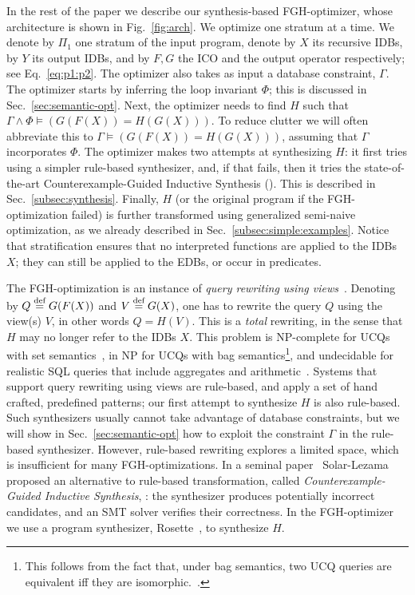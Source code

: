 In the rest of the paper we describe our synthesis-based
FGH-optimizer, whose architecture is shown in Fig.~\ref{fig:arch}.  We
optimize one stratum at a time.  We denote by $\Pi_1$ one stratum of
the input program, denote by $X$ its recursive IDBs, by $Y$ its output
IDBs, and by $F,G$ the ICO and the output operator respectively; see
Eq.~\eqref{eq:p1:p2}.  The optimizer also takes as input a database
constraint, $\Gamma$.  The optimizer starts by inferring the loop
invariant $\Phi$; this is discussed in Sec.~\ref{sec:semantic-opt}.
Next, the optimizer needs to find $H$ such that
$\Gamma \wedge \Phi \models \left(G(F(X)) = H(G(X))\right)$.  To
reduce clutter we will often abbreviate this to
$\Gamma \models \left(G(F(X)) = H(G(X))\right)$, assuming that
$\Gamma$ incorporates $\Phi$.  The optimizer makes two attempts at
synthesizing $H$: it first tries using a simpler rule-based
synthesizer, and, if that fails, then it tries the state-of-the-art
Counterexample-Guided Inductive Synthesis (\cegis).  This is described
in Sec.~\ref{subsec:synthesis}.  Finally, $H$ (or the original program
if the FGH-optimization failed) is further transformed using
generalized semi-naive optimization, as we already described in
Sec.~\ref{subsec:simple:examples}.  Notice that stratification ensures
that no interpreted functions are applied to the IDBs $X$; they can
still be applied to the EDBs, or occur in predicates.

The FGH-optimization is an instance of {\em query rewriting using
  views}~\cite{DBLP:journals/vldb/Halevy01,DBLP:conf/sigmod/GoldsteinL01}.
Denoting by $Q \stackrel{\text{def}}{=} G(F(X))$ and $V \stackrel{\text{def}}{=} G(X)$, one has to rewrite
the query $Q$ using the view(s) $V$, in other words $Q = H(V)$.  This
is a {\em total} rewriting, in the sense that $H$ may no longer 
refer to the IDBs $X$.  This problem is NP-complete for UCQs with
set semantics~\cite{DBLP:conf/pods/LevyMSS95}, in NP for UCQs with bag
semantics\footnote{This follows from the fact that, under bag semantics, two UCQ queries are
  equivalent iff they are
  isomorphic.~\cite{DBLP:conf/icdt/Green09,DBLP:journals/pvldb/WangHSHL20}.},
and undecidable for realistic SQL queries that include aggregates and
arithmetic~\cite{DBLP:conf/sigmod/GoldsteinL01}.
%
Systems that support query rewriting using views are rule-based, and
apply a set of hand crafted, predefined patterns; our first attempt to
synthesize $H$ is also rule-based.  Such synthesizers usually cannot take advantage
of database constraints, but we will show in
Sec.~\ref{sec:semantic-opt} how to exploit the constraint $\Gamma$ in
the rule-based synthesizer.  However, rule-based rewriting explores a
limited space, which is insufficient for many FGH-optimizations.
In a seminal paper~\cite{DBLP:conf/asplos/Solar-LezamaTBSS06}
Solar{-}Lezama proposed an alternative to rule-based transformation,
called {\em Counterexample-Guided Inductive Synthesis}, \cegis: the
synthesizer produces potentially incorrect candidates, and an SMT
solver verifies their correctness.  In the FGH-optimizer we use a
program synthesizer, Rosette~\cite{DBLP:conf/oopsla/TorlakB13}, to synthesize $H$.

